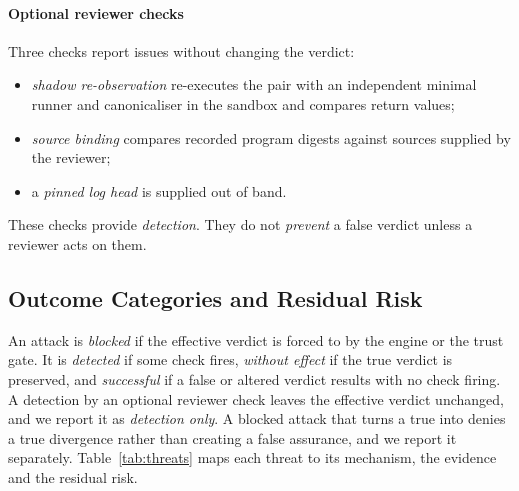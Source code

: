 \paragraph*{Optional reviewer checks} Three checks report issues without changing the verdict:
\begin{itemize}
\item \emph{shadow re-observation} re-executes the pair with an independent minimal runner and canonicaliser in the sandbox and compares return values;
\item \emph{source binding} compares recorded program digests against sources supplied by the reviewer;
\item a \emph{pinned log head} is supplied out of band.
\end{itemize}
These checks provide \emph{detection}. They do not \emph{prevent} a false verdict unless a reviewer acts on them.

\subsection{Outcome Categories and Residual Risk}
An attack is \emph{blocked} if the effective verdict is forced to \INS{} by the engine or the trust gate. It is \emph{detected} if some check fires, \emph{without effect} if the true verdict is preserved, and \emph{successful} if a false or altered verdict results with no check firing. A detection by an optional reviewer check leaves the effective verdict unchanged, and we report it as \emph{detection only}. A blocked attack that turns a true \DIV{} into \INS{} denies a true divergence rather than creating a false assurance, and we report it separately. Table~\ref{tab:threats} maps each threat to its mechanism, the evidence and the residual risk.

